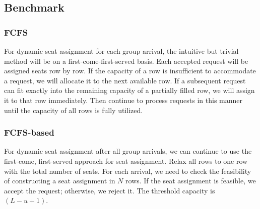 



\subsection{Benchmark}
 

\subsubsection{FCFS}\label{largest_pattern}
For dynamic seat assignment for each group arrival, the intuitive but trivial method will be on a first-come-first-served basis. Each accepted request will be assigned seats row by row. If the capacity of a row is insufficient to accommodate a request, we will allocate it to the next available row. If a subsequent request can fit exactly into the remaining capacity of a partially filled row, we will assign it to that row immediately. Then continue to process requests in this manner until the capacity of all rows is fully utilized.



\subsubsection{FCFS-based}\label{FCFS-based}
For dynamic seat assignment after all group arrivals, we can continue to use the first-come, first-served approach for seat assignment. Relax all rows to one row with the total number of seats. For each arrival, we need to check the feasibility of constructing a seat assignment in $N$ rows. If the seat assignment is feasible, we accept the request; otherwise, we reject it. The threshold capacity is $(L -u +1)$.




